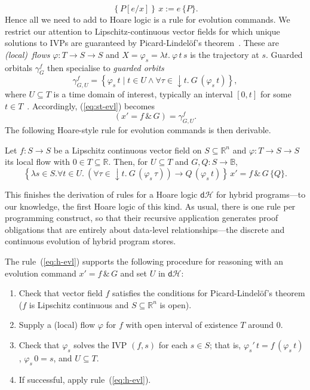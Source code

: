 \documentclass[envcountsame,envcountsect]{llncs}
\newcommand{\dH}{\mathsf{d}\mathcal{H}}
\newcommand{\flow}{\varphi}
\newcommand{\reals}{\mathbb{R}}
\newcommand{\bools}{\mathbb{B}}
\begin{document}
\begin{equation}
\left\{P[e/x]\right\}\,  x:=e\, \{P\}. \label{eq:h-assgn}\tag{h-assgn}
\end{equation}
Hence all we need to add to Hoare logic is a rule for evolution
commands.  We restrict our attention to Lipschitz-continuous vector
fields for which unique solutions to IVPs are guaranteed by
Picard-Lindel\"of's theorem~\cite{Teschl12}.  These are \emph{(local)\
  flows} $\flow:T\to S\to S$ and $X=\flow_s=\lambda t.\ \flow\, t\, s$
is the trajectory at $s$. Guarded orbitals $\gamma^f_G$ then
specialise to \emph{guarded orbits}
\begin{equation*}
  \gamma^f_{G,U} = \left\{\flow_s\, t\mid t\in U\land \forall\tau \in
  {\downarrow}t.\ G\, (\flow_s\, t)\right\},
\end{equation*}
where $U\subseteq T$ is a time domain of interest, typically an
interval $[0,t]$ for some $t\in T$~\cite{MuniveS19}.  Accordingly,
(\ref{eq:st-evl}) becomes
\begin{equation}
  \left(x' = f\, \&\, G\right)= \gamma^f_{G,U}.\label{eq:st-evl-flow}\tag{st-evl-flow}
\end{equation}
The following Hoare-style rule for evolution commands is then
derivable.
\begin{lemma}\label{P:h-evl-lemma}
  Let $f:S\to S$ be a Lipschitz continuous vector field on
  $S\subseteq \reals^n$ and $\flow:T\to S\to S$ its local flow with
  $0\in T\subseteq \reals$. Then, for $U\subseteq T$ and
  $G,Q:S\to\bools$,
\begin{equation}
\left\{\lambda s\in S.\forall t\in U.\ \left(\forall
\tau\in {\downarrow}t.\ G\, (\flow_s\, \tau)\right) \rightarrow Q\,
(\flow_s\, t)\right\}\, x' = f\, \&\, G\, \{Q\}. \label{eq:h-evl}\tag{h-evl}
\end{equation}
\end{lemma}

This finishes the derivation of rules for a Hoare logic $\dH$ for
hybrid programs---to our knowledge, the first Hoare logic of this
kind. As usual, there is one rule per programming construct, so that
their recursive application generates proof obligations that are
entirely about data-level relationships---the discrete and continuous
evolution of hybrid program stores.

The rule~(\ref{eq:h-evl}) supports the following procedure
for reasoning with an evolution command $x' = f\, \&\, G$ and set $U$
in $\dH$:
\begin{enumerate}
\item Check that vector field $f$ satisfies the conditions for
  Picard-Lindel\"of's theorem ($f$ is Lipschitz continuous and
  $S\subseteq\reals^n$ is open).
\item Supply a (local) flow $\flow$ for $f$ with open interval of
  existence $T$ around $0$.
\item Check that $\flow_s$ solves the IVP $(f,s)$ for each $s\in S$;
  that is, $\flow_s'\, t = f\, (\flow_s\, t)$, $\flow_s\, 0 = s$, and
  $U\subseteq T$.
\item If successful, apply rule~(\ref{eq:h-evl}).
\end{enumerate}
\end{document}
